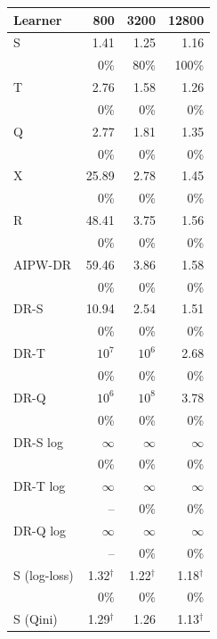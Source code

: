 \begin{tabular}{l|rrr}
\hline
Learner & 800 & 3200 & 12800 \\
\hline
S & 1.41 & 1.25 & 1.16 \\
 & \scriptsize 0\% & \scriptsize 80\% & \scriptsize 100\% \\[2pt]
T & 2.76 & 1.58 & 1.26 \\
 & \scriptsize 0\% & \scriptsize 0\% & \scriptsize 0\% \\[2pt]
\hline
Q & 2.77 & 1.81 & 1.35 \\
 & \scriptsize 0\% & \scriptsize 0\% & \scriptsize 0\% \\[2pt]
\hline
X & 25.89 & 2.78 & 1.45 \\
 & \scriptsize 0\% & \scriptsize 0\% & \scriptsize 0\% \\[2pt]
R & 48.41 & 3.75 & 1.56 \\
 & \scriptsize 0\% & \scriptsize 0\% & \scriptsize 0\% \\[2pt]
AIPW-DR & 59.46 & 3.86 & 1.58 \\
 & \scriptsize 0\% & \scriptsize 0\% & \scriptsize 0\% \\[2pt]
\hline
DR-S & 10.94 & 2.54 & 1.51 \\
 & \scriptsize 0\% & \scriptsize 0\% & \scriptsize 0\% \\[2pt]
DR-T & $10^{7}$ & $10^{6}$ & 2.68 \\
 & \scriptsize 0\% & \scriptsize 0\% & \scriptsize 0\% \\[2pt]
DR-Q & $10^{6}$ & $10^{8}$ & 3.78 \\
 & \scriptsize 0\% & \scriptsize 0\% & \scriptsize 0\% \\[2pt]
\hline
DR-S log & $\infty$ & $\infty$ & $\infty$ \\
 & \scriptsize 0\% & \scriptsize 0\% & \scriptsize 0\% \\[2pt]
DR-T log & $\infty$ & $\infty$ & $\infty$ \\
 & \scriptsize -- & \scriptsize 0\% & \scriptsize 0\% \\[2pt]
DR-Q log & $\infty$ & $\infty$ & $\infty$ \\
 & \scriptsize -- & \scriptsize 0\% & \scriptsize 0\% \\[2pt]
\hline
S (log-loss) & 1.32$^\dagger$ & 1.22$^\dagger$ & 1.18$^\dagger$ \\
 & \scriptsize 0\% & \scriptsize 0\% & \scriptsize 0\% \\[2pt]
S (Qini) & 1.29$^\dagger$ & 1.26 & 1.13$^\dagger$ \\

\end{tabular}
